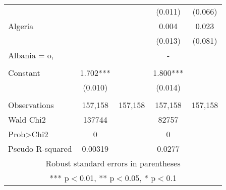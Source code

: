 \documentclass[]{article}
\begin{document}
\begin{tabular}{lcccc}
 &  &  & (0.011) & (0.066) \\
Algeria &  &  & 0.004 & 0.023 \\
 &  &  & (0.013) & (0.081) \\
Albania = o, &  &  & - &  \\
 &  &  &  &  \\
Constant & 1.702*** &  & 1.800*** &  \\
 & (0.010) &  & (0.014) &  \\
 &  &  &  &  \\
Observations & 157,158 & 157,158 & 157,158 & 157,158 \\
Wald Chi2 & 137744 &  & 82757 &  \\
Prob>Chi2 & 0 &  & 0 &  \\
 Pseudo R-squared & 0.00319 &  & 0.0277 &  \\ \hline
\multicolumn{5}{c}{ Robust standard errors in parentheses} \\
\multicolumn{5}{c}{ *** p$<$0.01, ** p$<$0.05, * p$<$0.1} \\
\end{tabular}
\end{document}
